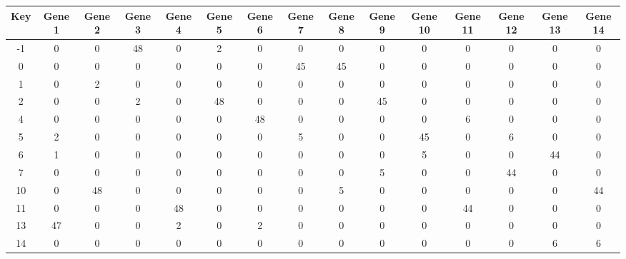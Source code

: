 \begin{tabular}{|c|c|c|c|c|c|c|c|c|c|c|c|c|c|c|}
\hline
Key & Gene 1 & Gene 2 & Gene 3 & Gene 4 & Gene 5 & Gene 6 & Gene 7 & Gene 8 & Gene 9 & Gene 10 & Gene 11 & Gene 12 & Gene 13 & Gene 14 \\
\hline
-1 & 0 & 0 & 48 & 0 & 2 & 0 & 0 & 0 & 0 & 0 & 0 & 0 & 0 & 0 \\
0 & 0 & 0 & 0 & 0 & 0 & 0 & 45 & 45 & 0 & 0 & 0 & 0 & 0 & 0 \\
1 & 0 & 2 & 0 & 0 & 0 & 0 & 0 & 0 & 0 & 0 & 0 & 0 & 0 & 0 \\
2 & 0 & 0 & 2 & 0 & 48 & 0 & 0 & 0 & 45 & 0 & 0 & 0 & 0 & 0 \\
4 & 0 & 0 & 0 & 0 & 0 & 48 & 0 & 0 & 0 & 0 & 6 & 0 & 0 & 0 \\
5 & 2 & 0 & 0 & 0 & 0 & 0 & 5 & 0 & 0 & 45 & 0 & 6 & 0 & 0 \\
6 & 1 & 0 & 0 & 0 & 0 & 0 & 0 & 0 & 0 & 5 & 0 & 0 & 44 & 0 \\
7 & 0 & 0 & 0 & 0 & 0 & 0 & 0 & 0 & 5 & 0 & 0 & 44 & 0 & 0 \\
10 & 0 & 48 & 0 & 0 & 0 & 0 & 0 & 5 & 0 & 0 & 0 & 0 & 0 & 44 \\
11 & 0 & 0 & 0 & 48 & 0 & 0 & 0 & 0 & 0 & 0 & 44 & 0 & 0 & 0 \\
13 & 47 & 0 & 0 & 2 & 0 & 2 & 0 & 0 & 0 & 0 & 0 & 0 & 0 & 0 \\
14 & 0 & 0 & 0 & 0 & 0 & 0 & 0 & 0 & 0 & 0 & 0 & 0 & 6 & 6 \\
\hline
\end{tabular}